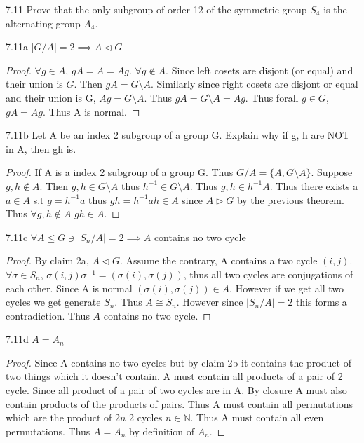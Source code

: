 \documentclass{article}
\newcommand{\N}{\mathbb{N}}
\begin{document}
\bigskip

\begin{PROB}{7.11}\label{Problem 7.11.}
    Prove that the only subgroup of order 12 of the symmetric group $S_4$ is the alternating group $A_4$.
\end{PROB}
\begin{claim}{7.11a}
    $|G/A| = 2 \implies A \triangleleft G$
\end{claim}
\begin{proof}
    $\forall g \in A$, $gA = A = Ag$. $\forall g \not \in A$. Since left cosets are disjont (or equal) and their union is $G$. Then $gA = G \setminus A$. Similarly since right cosets are disjont or equal and their union is G, $Ag = G \setminus A$. Thus $gA = G \setminus A = Ag$. Thus forall $g \in G$, $gA = Ag$. Thus A is normal.
\end{proof}
\begin{claim}{7.11b}
    Let A be an index 2 subgroup of a group G. Explain why if g, h are NOT in A, then gh is.
\end{claim}
\begin{proof}
    If A is a index 2 subgroup of a group G. Thus $G/A = \{A, G \setminus A\}$. Suppose $g, h \not \in A$. Then $g, h \in G \setminus A$ thus $h^{-1} \in G \setminus A$. Thus $g, h \in h^{-1}A$. Thus there exists a $a \in A$ s.t $g = h^{-1}a$ thus $gh = h^{-1}ah \in A$ since $A \triangleright G$ by the previous theorem. Thus $\forall g, h \not \in A$ $gh \in A$. 
\end{proof}
\begin{claim}{7.11c}
    $\forall A \leq G \ni |S_n/A| = 2 \implies A$ contains no two cycle
\end{claim}
\begin{proof}
    By claim 2a, $A \triangleleft G$.
    Assume the contrary, A contains a two cycle $(i,j)$. $\forall \sigma \in S_n$, $\sigma(i, j)\sigma^{-1} = (\sigma(i), \sigma(j))$, thus all two cycles are conjugations of each other. Since A is normal $(\sigma(i), \sigma(j)) \in A$. However if we get all two cycles we get generate $S_n$. Thus $A \cong S_n$. However since $|S_n/A| = 2$ this forms a contradiction. Thus $A$ contains no two cycle.
\end{proof}
\begin{claim}{7.11d}
    $A = A_n$
\end{claim}
\begin{proof}
    Since A contains no two cycles but by claim 2b it contains the product of two things which it doesn't contain. A must contain all products of a pair of 2 cycle. Since all product of a pair of two cycles are in A. By closure A must also contain products of the products of pairs. Thus A must contain all permutations which are the product of $2n$ 2 cycles $n \in \N$. Thus A must contain all even permutations. Thus $A = A_n$ by definition of $A_n$. 
\end{proof}
\end{document}
